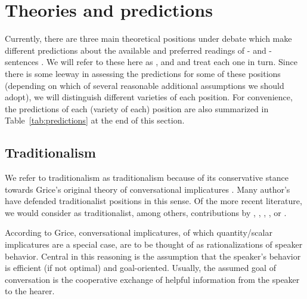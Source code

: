 \documentclass[fleqn,reqno,10pt,draft]{article}
\newcommand{\as}{\acro{as}}
\renewcommand{\es}{\acro{es}}
\begin{document}
\section{Theories and predictions}
\label{sec:theories-predictions}

Currently, there are three main theoretical positions under debate
which make different predictions about the available and preferred
readings of \as- and \es-sentences \citep[c.f.][for
overview]{Horn2006:The-Border-Wars,Geurts2010:Quantity-Implic,Sauerland2012:The-Computation}. We
will refer to these here as ,
 and  and treat each
one in turn. Since there is some leeway in assessing the predictions
for some of these positions (depending on which of several reasonable
additional assumptions we should adopt), we will distinguish different
varieties of each position. For convenience, the predictions of each
(variety of each) position are also summarized in
Table~\ref{tab:predictions} at the end of this section.

\subsection{Traditionalism}
\label{sec:traditionalism}

We refer to traditionalism as traditionalism because of its
conservative stance towards Grice's original theory of conversational
implicatures \citep{Grice1975:Logic-and-Conve}. Many author's have
defended traditionalist positions in this sense. Of the more recent
literature, we would consider as traditionalist, among others,
contributions by \citet{Spector2006:Scalar-Implicat},
\citet{Sauerland2004:Scalar-Implicat},
\citet{Russell2006:Against-Grammat},
\citet{vanRooijSchulz:ExhaustiveInterpretation},
\citet{Geurts2010:Quantity-Implic} or
\citet{Franke2011:Quantity-Implic}.

According to Grice, conversational implicatures, of which
quantity/scalar implicatures are a special case, are to be thought of
as rationalizations of speaker behavior. Central in this reasoning is
the assumption that the speaker's behavior is efficient (if not
optimal) and goal-oriented. Usually, the assumed goal of conversation
is the cooperative exchange of helpful information from the speaker to
the hearer.
\end{document}

